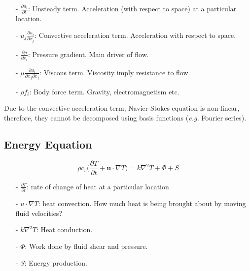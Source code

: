 \documentclass{article}
\begin{document}
        \begin{multicols}{2}
        \begin{itemize}
            \item[-] $\frac{\partial u_{i}}{\partial t}$: Unsteady term. Acceleration (with respect to space) at a particular location.
    
            \item[-] $u_{j}\frac{\partial u_{i}}{\partial x_{j}}$: Convective acceleration term. Acceleration with respect to space.
    
            \item[-] $\frac{\partial p}{\partial x_{i}}$: Pressure gradient. Main driver of flow.
        
            \item[-] $\mu \frac{\partial u_{i}}{\partial x_{j}\partial x_{j}}$: Viscous term. Viscosity imply resistance to flow.
    
            \item[-] $\rho f_{i}$: Body force term. Gravity, electromagnetism etc.
        \end{itemize}
        \end{multicols}
        Due to the convective acceleration term, Navier-Stokes equation is non-linear, therefore, they cannot be decomposed using basis functions (\textit{e.g.} Fourier series).
        
    \subsection{Energy Equation}
        \[\rho c_{v} \bigg(\frac{\partial T}{\partial t} + \mathbf{u}\cdot \nabla T \bigg) = k\nabla^{2}T + \Phi + \dot{S} \]
        
        \begin{multicols}{2}
        \begin{itemize}
            \item[-] $\frac{\partial T}{\partial t}$: rate of change of heat at a particular location
    
            \item[-] $u\cdot \nabla T$: heat convection. How much heat is being brought about by moving fluid velocities?
    
            \item[-] $k\nabla^{2}T$: Heat conduction. 
        
            \item[-] $\Phi$: Work done by fluid shear and pressure.
    
            \item[-] $\dot{S}$: Energy production.
        \end{itemize}
        \end{multicols}
        
\end{document}

